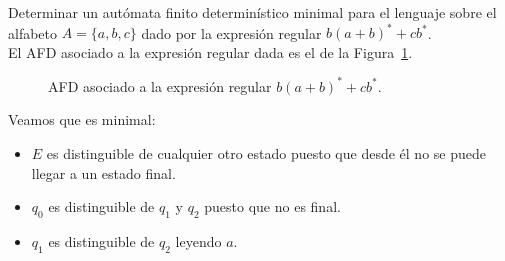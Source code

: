 \begin{ejercicio}\label{ej:1.3.17}
    Determinar un autómata finito determinístico minimal para el lenguaje sobre el alfabeto $A=\{a,b,c\}$ dado por la expresión regular $b{(a+b)}^{\ast}+cb^\ast$.\\

    El AFD asociado a la expresión regular dada es el de la Figura~\ref{fig:1.3.17-AFD}.
    \begin{figure}[H]
        \centering
        \caption{AFD asociado a la expresión regular $b{(a+b)}^{\ast}+cb^\ast$.}
        \label{fig:1.3.17-AFD}
    \end{figure}

    Veamos que es minimal:
    \begin{itemize}
        \item $E$ es distinguible de cualquier otro estado puesto que desde él no se puede llegar a un estado final.
        \item $q_0$ es distinguible de $q_1$ y $q_2$ puesto que no es final.
        \item $q_1$ es distinguible de $q_2$ leyendo $a$.
    \end{itemize}
\end{ejercicio}

